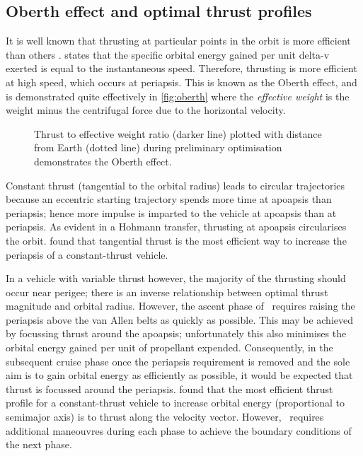\subsection{Oberth effect and optimal thrust profiles} \label{sub:Oberth}

It is well known that thrusting at particular points in the orbit is more efficient than others \parencite{Kemble2006}. \textcite{Oberth1923} states that the specific orbital energy gained per unit delta-v exerted is equal to the instantaneous speed. Therefore, thrusting is more efficient at high speed, which occurs at periapsis. This is known as the Oberth effect, and is demonstrated quite effectively in \autoref{fig:oberth} where the \emph{effective weight} is the weight minus the centrifugal force due to the horizontal velocity.

\begin{figure}
\centering
\def\svgwidth{\figurewidth}

\caption{Thrust to effective weight ratio (darker line) plotted with distance from Earth (dotted line) during preliminary optimisation demonstrates the Oberth effect.} \label{fig:oberth}
\end{figure}

Constant thrust (tangential to the orbital radius) leads to circular trajectories because an eccentric starting trajectory spends more time at apoapsis than periapsis; hence more impulse is imparted to the vehicle at apoapsis than at periapsis. As evident in a Hohmann transfer, thrusting at apoapsis circularises the orbit. \textcite{Racca9} found that tangential thrust is the most efficient way to increase the periapsis of a constant-thrust vehicle.

In a vehicle with variable thrust however, the majority of the thrusting should occur near perigee; there is an inverse relationship between optimal thrust magnitude and orbital radius. However, the ascent phase of \BW\ requires raising the periapsis above the van Allen belts as quickly as possible. This may be achieved by focussing thrust around the apoapsis; unfortunately this also minimises the orbital energy gained per unit of propellant expended. Consequently, in the subsequent cruise phase once the periapsis requirement is removed and the sole aim is to gain orbital energy as efficiently as possible, it would be expected that thrust is focussed around the periapsis. \textcite{Racca9} found that the most efficient thrust profile for a constant-thrust vehicle to increase orbital energy (proportional to semimajor axis) is to thrust along the velocity vector. However, \BW\ requires additional maneouvres during each phase to achieve the boundary conditions of the next phase. 

